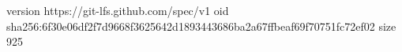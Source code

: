 version https://git-lfs.github.com/spec/v1
oid sha256:6f30e06df2f7d9668f3625642d1893443686ba2a67ffbeaf69f70751fc72ef02
size 925
